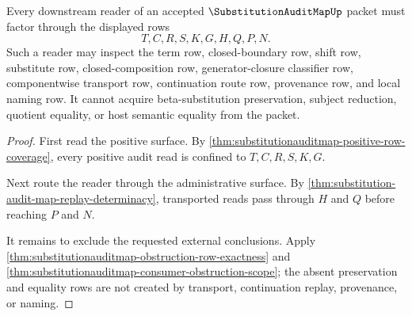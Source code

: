 \begin{theorem}
\label{thm:substitutionauditmap-downstream-reader-boundary}
Every downstream reader of an accepted $\SubstitutionAuditMapUp$ packet must factor through the displayed rows
$$
T,C,R,S,K,G,H,Q,P,N.
$$
Such a reader may inspect the term row, closed-boundary row, shift row, substitute row, closed-composition row, generator-closure classifier row, componentwise transport row, continuation route row, provenance row, and local naming row. It cannot acquire beta-substitution preservation, subject reduction, quotient equality, or host semantic equality from the packet.
\end{theorem}
\begin{proof}
First read the positive surface. By \autoref{thm:substitutionauditmap-positive-row-coverage}, every positive audit read is confined to $T,C,R,S,K,G$.

Next route the reader through the administrative surface. By \autoref{thm:substitution-audit-map-replay-determinacy}, transported reads pass through $H$ and $Q$ before reaching $P$ and $N$.

It remains to exclude the requested external conclusions. Apply \autoref{thm:substitutionauditmap-obstruction-row-exactness} and \autoref{thm:substitutionauditmap-consumer-obstruction-scope}; the absent preservation and equality rows are not created by transport, continuation replay, provenance, or naming.
\end{proof}


